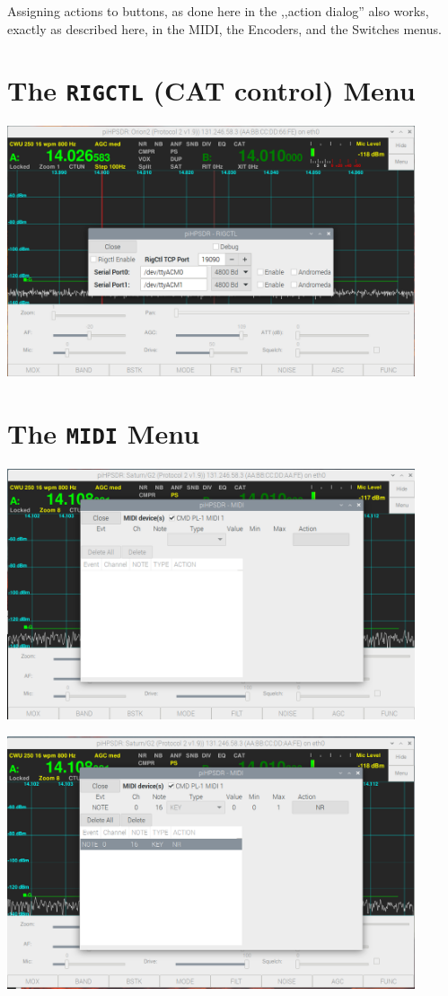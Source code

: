 \documentclass[12pt]{book}
\begin{document}
Assigning actions to buttons, as done here in the ,,action dialog'' also works, exactly as described here,
in the MIDI, the Encoders, and the Switches menus.


\section{The \texttt{RIGCTL} (CAT control) Menu}
\begin{center}
\includegraphics[width=12cm]{RigCtlMenu.png}
\end{center}

\section{The \texttt{MIDI} Menu}
\begin{center}
\includegraphics[width=12cm]{MIDImenu1.png}
\end{center}

\begin{center}
\includegraphics[width=12cm]{MIDImenu2.png}
\end{center}
\end{document}
